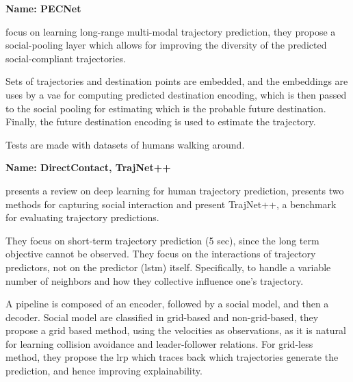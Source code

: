 
\textbf{Name: PECNet}

\cite{mangalam2020not} focus on learning long-range multi-modal trajectory prediction, they propose a social-pooling layer which allows for improving the diversity of the predicted social-compliant trajectories.

Sets of trajectories and destination points are embedded, and the embeddings are uses by a \gls{vae} for computing predicted destination encoding, which is then passed to the social pooling for estimating which is the probable future destination.
%
Finally, the future destination encoding is used to estimate the trajectory.
%

Tests are made with datasets of humans walking around.


\textbf{Name: DirectContact, TrajNet++}

\cite{kothari2021human} presents a review on deep learning for human trajectory prediction, presents two methods for capturing social interaction and present TrajNet++, a benchmark for evaluating trajectory predictions. 

They focus on short-term trajectory prediction (5 sec), since the long term objective cannot be observed.
%
They focus on the interactions of trajectory predictors, not on the predictor (\gls{lstm}) itself.
%
Specifically, to handle a variable number of neighbors and how they collective influence one's trajectory.

A pipeline is composed of an encoder, followed by a social model, and then a decoder.
%
Social model are classified in grid-based and non-grid-based, they propose a grid based method, using the velocities as observations, as it is natural for learning collision avoidance and leader-follower relations.
%
For grid-less method, they propose the \gls{lrp} which traces back which trajectories generate the prediction, and hence improving explainability.



\cite{navarro2022social}


\cite{zhou2023csr}


\cite{peng2023mrgtraj}